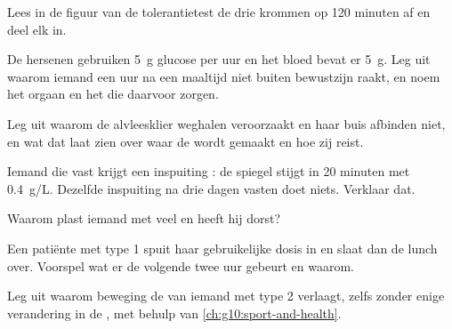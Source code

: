 \begin{exercise}[$\star$]\label{exo:g12:glucose-and-diabetes:5}
Lees in de figuur van de tolerantietest de drie krommen op 120 minuten af
en deel elk in.
\end{exercise}

\begin{exercise}[$\star\star$]\label{exo:g12:glucose-and-diabetes:6}
De hersenen gebruiken \qty{5}{g} glucose per uur en het bloed bevat er
\qty{5}{g}. Leg uit waarom iemand een uur na een maaltijd niet buiten
bewustzijn raakt, en noem het orgaan en het  die daarvoor zorgen.
\end{exercise}

\begin{exercise}[$\star\star$]\label{exo:g12:glucose-and-diabetes:7}
Leg uit waarom de alvleesklier weghalen  veroorzaakt en haar buis
afbinden niet, en wat dat laat zien over waar de  wordt gemaakt en
hoe zij reist.
\end{exercise}

\begin{exercise}[$\star\star$]\label{exo:g12:glucose-and-diabetes:8}
Iemand die vast krijgt een inspuiting : de spiegel stijgt in 20
minuten met \qty{0.4}{g/L}. Dezelfde inspuiting na drie dagen vasten doet
niets. Verklaar dat.
\end{exercise}

\begin{exercise}[$\star\star$]\label{exo:g12:glucose-and-diabetes:9}
Waarom plast iemand met  veel en heeft hij dorst?
\end{exercise}

\begin{exercise}[$\star\star$]\label{exo:g12:glucose-and-diabetes:10}
Een patiënte met type 1 spuit haar gebruikelijke dosis  in en
slaat dan de lunch over. Voorspel wat er de volgende twee uur gebeurt en
waarom.
\end{exercise}

\begin{exercise}[$\star\star$]\label{exo:g12:glucose-and-diabetes:11}
Leg uit waarom beweging de  van iemand met type 2
verlaagt, zelfs zonder enige verandering in de , met behulp van
\cref{ch:g10:sport-and-health}.
\end{exercise}

